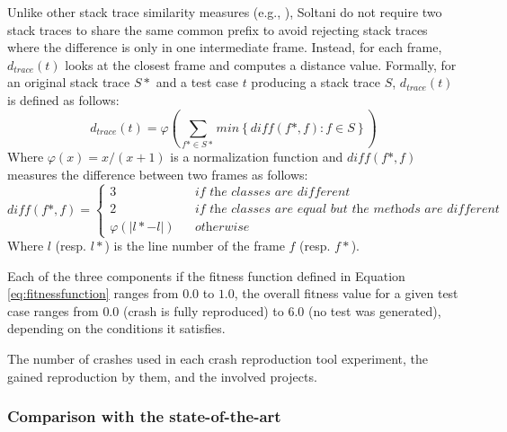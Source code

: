 Unlike other stack trace similarity measures (e.g., \cite{Rossler2013}), Soltani \etal \cite{Soltani2018a} do not require two stack traces to share the same common prefix to avoid rejecting stack traces where the difference is only in one intermediate frame. Instead, for each frame, $d_{trace}(t)$ looks at the closest frame and computes a distance value. Formally, for an original stack trace $S*$ and a test case $t$ producing a stack trace $S$, $d_{trace}(t)$ is defined as follows:
%
\begin{equation}
d_{trace}(t) = \varphi \left( \sum_{f* \in S*} min \left\lbrace \mathit{diff}(f*, f) : f \in S \right\rbrace \right)
\end{equation}
%
Where $\varphi (x) = x / (x+1)$ is a normalization function \cite{McMinn2004} and $\mathit{diff}(f*, f)$ measures the difference between two frames as follows: 
%
\begin{equation}
\mathit{diff}(f*, f) = 
\left\{
  \begin{array}{lcr}
    3 && \textit{if the classes are different}\\
    2  && \textit{if the classes are equal but the methods are different}\\
     \varphi \left( \vert l* - l \vert \right)   && \textit{otherwise}
  \end{array}
\right.
\end{equation}
%
Where $l$ (resp. $l*$) is the line number of the frame $f$ (resp. $f*$).

Each of the three components if the fitness function defined in Equation \ref{eq:fitnessfunction} ranges from $0.0$ to $1.0$, the overall fitness value for a given test case ranges from $0.0$ (crash is fully reproduced) to $6.0$ (no test was generated), depending on the conditions it satisfies. 


\begin{table*}[t]
	\centering
	\caption{The number of crashes used in each crash reproduction tool experiment, the gained reproduction by them, and the involved projects.}
	\label{tab:background:represults}
	
\end{table*}

\subsubsection{Comparison with the state-of-the-art}



